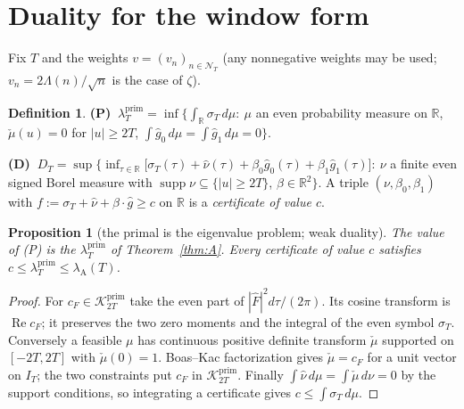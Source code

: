 \documentclass[10pt]{amsart}
\newtheorem{proposition}[theorem]{Proposition}
\theoremstyle{definition}
\newtheorem{definition}[theorem]{Definition}
\theoremstyle{remark}
\newcommand{\R}{\mathbb R}
\newcommand{\Rel}{\operatorname{Re}}
\newcommand{\supp}{\operatorname{supp}}
\newcommand{\Kp}{\mathcal K^{\mathrm{prim}}_{2T}}
\newcommand{\IT}{I_T}
\newcommand{\lamP}{\lambda^{\mathrm{prim}}_T}
\newcommand{\lamA}{\lambda_{\mathrm A}(T)}
\newcommand{\sT}{\sigma_T}
\newcommand{\gh}[1]{\widehat g_{#1}}
\newcommand{\nuh}{\widehat\nu}
\newcommand{\Fh}{\widehat F}
\newcommand{\cF}{c_F}
\newcommand{\NT}{\mathcal N_T}
\begin{document}
\section{Duality for the window form}\label{sec:duality}

Fix $T$ and the weights $v=(v_n)_{n\in\NT}$ (any nonnegative weights may be used; $v_n=2\Lambda(n)/\sqrt n$
is the case of $\zeta$).

\begin{definition}\label{def:PD}
\textbf{(P)} $\ \lamP=\inf\big\{\int_\R\sT\,d\mu:\ \mu$ an even probability measure on $\R$,
$\check\mu(u)=0$ for $|u|\ge2T$, $\int\gh0\,d\mu=\int\gh1\,d\mu=0\big\}$.

\textbf{(D)} $\ D_T=\sup\big\{\inf_{\tau\in\R}\big[\sT(\tau)+\nuh(\tau)+\beta_0\gh0(\tau)+\beta_1\gh1(\tau)\big]:\
\nu$ a finite even signed Borel measure with $\supp\nu\subseteq\{|u|\ge2T\}$, $\beta\in\R^2\big\}$.
A triple $(\nu,\beta_0,\beta_1)$ with $f:=\sT+\nuh+\beta\cdot\widehat g\ge c$ on $\R$ is a
\emph{certificate of value $c$}.
\end{definition}

\begin{proposition}[the primal is the eigenvalue problem; weak duality]\label{prop:weak}
The value of \textup{(P)} is the $\lamP$ of Theorem~\ref{thm:A}. Every certificate of value $c$
satisfies $c\le\lamP\le\lamA$.
\end{proposition}
\begin{proof}
For $\cF\in\Kp$ take the even part of $|\Fh|^2d\tau/(2\pi)$.
Its cosine transform is $\Rel\cF$; it preserves the two zero moments
and the integral of the even symbol $\sT$. Conversely a feasible
$\mu$ has continuous positive definite transform $\check\mu$ supported
on $[-2T,2T]$ with $\check\mu(0)=1$. Boas--Kac factorization
\cite{BoasKac1945} gives $\check\mu=\cF$ for a unit vector on $\IT$;
the two constraints put $\cF$ in $\Kp$. Finally
$\int\nuh\,d\mu=\int\check\mu\,d\nu=0$ by the support conditions,
so integrating a certificate gives $c\le\int\sT\,d\mu$.
\end{proof}
\end{document}

